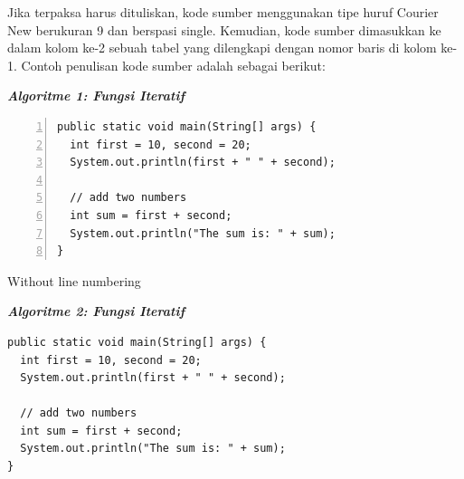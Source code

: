 Jika terpaksa harus dituliskan, kode sumber menggunakan tipe huruf Courier New berukuran 9 dan berspasi single. Kemudian, kode sumber dimasukkan ke dalam kolom ke-2 sebuah tabel yang dilengkapi dengan nomor baris di kolom ke-1. Contoh penulisan kode sumber adalah sebagai berikut: 

\noindent\textbf{\textit{Algoritme 1: Fungsi Iteratif}}
\begin{Verbatim}[numbers=left,xleftmargin=5mm,fontsize=\small]
public static void main(String[] args) {    
  int first = 10, second = 20;
  System.out.println(first + " " + second);

  // add two numbers
  int sum = first + second;
  System.out.println("The sum is: " + sum);
}
\end{Verbatim}

\noindent Without line numbering

\noindent\textbf{\textit{Algoritme 2: Fungsi Iteratif}}

\begin{Verbatim}[fontsize=\small]
public static void main(String[] args) {    
  int first = 10, second = 20;
  System.out.println(first + " " + second);

  // add two numbers
  int sum = first + second;
  System.out.println("The sum is: " + sum);
}
\end{Verbatim}